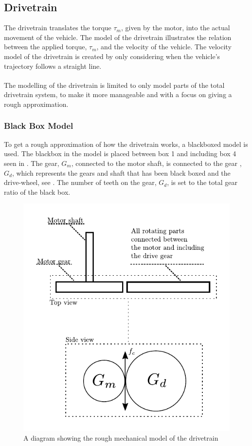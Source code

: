 \subsection{Drivetrain}\label{Drivetrain}

The drivetrain translates the torque $\tau_m$, given by the motor, into the actual movement of the vehicle. The model of the drivetrain illustrates the relation between the applied torque, $\tau_m$, and the velocity of the vehicle. The velocity model of the drivetrain is created by only considering when the vehicle's trajectory follows a straight line.\\\\
%
The modelling of the drivetrain is limited to only model parts of the total drivetrain system, to make it more manageable and with a focus on giving a rough approximation.
\subsubsection{Black Box Model}\label{BlackBoxModel}
To get a rough approximation of how the drivetrain works, a blackboxed model is used. The blackbox in the model is placed between box 1 and including box 4 seen in  . The gear, $G_m$, connected to the motor shaft, is connected to the gear ,$G_d$, which represents the gears and shaft that has been black boxed and the drive-wheel, see . The number of teeth on the gear, $G_d$, is set to the total gear ratio of the black box.

\begin{figure}[H]
	\centering
	\includegraphics[scale=0.8]{figures/mechanicalDrawingSystem.pdf}
	\caption{A diagram showing the rough mechanical model of the drivetrain}
	\label{fig:DrivetrainMechanicalModel}
\end{figure}

